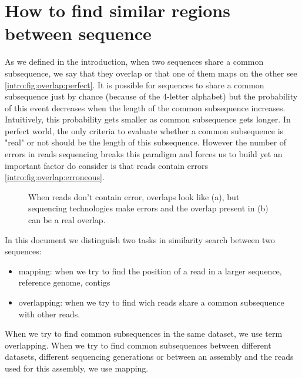 \documentclass[main.tex]{subfiles}
\begin{document}

 
\section{How to find similar regions between sequence} 

As we defined in the introduction, when two sequences share a common subsequence, we say that they overlap or that one of them maps on the other see \ref{intro:fig:overlap:perfect}. It is possible for sequences to share a common subsequence just by chance (because of the 4-letter alphabet) but the probability of this event decreases when the length of the common subsequence increases. Intuitively, this probability gets smaller as common subsequence gets longer. In perfect world, the only criteria to evaluate whether a common subsequence is "real" or not should be the length of this subsequence. However the number of errors in reads sequencing breaks this paradigm and forces us to build yet an important factor do consider is that reads contain errors \ref{intro:fig:overlap:erroneous}.

\begin{figure}[ht]
    \centering
    \caption{When reads don't contain error, overlaps look like (a), but sequencing technologies make errors and the overlap present in (b) can be a real overlap.}
    \label{intro:fig:overlap}
\end{figure}

In this document we distinguish two tasks in similarity search between two sequences:
\begin{itemize}
    \item mapping: when we try to find the position of a read in a larger sequence, reference genome, contigs
    \item overlapping: when we try to find wich reads share a common subsequence with other reads. 
\end{itemize}
When we try to find common subsequences in the same dataset, we use term overlapping. When we try to find common subsequences between different datasets, different sequencing generations or between an assembly and the reads used for this assembly, we use mapping.
\end{document}
